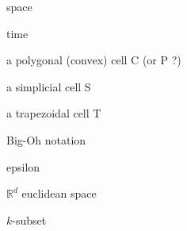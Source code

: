 
space

time

a polygonal (convex) cell C (or P ?)

a simplicial cell S

a trapezoidal cell T

Big-Oh notation

epsilon

\(\mathbb{R}^d\) euclidean space

\(k\)-subset
